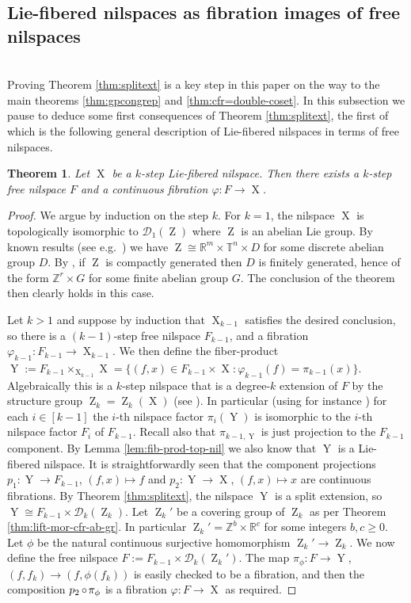 \documentclass[a4paper,12pt,reqno]{amsart}
\newtheorem{theorem}{Theorem}[section]
\theoremstyle{definition}
\def\to{\rightarrow}
\newcommand{\mc}{\mathcal}
\newcommand{\mb}{\mathbb}
\DeclareMathOperator{\ab}{Z}
\DeclareMathOperator{\ns}{X}
\DeclareMathOperator{\nss}{Y}
\DeclareMathOperator{\co}{\circ\hspace{-0.02 cm}}
\begin{document}
\subsection{Lie-fibered nilspaces as fibration images of free nilspaces}\hfill\smallskip\\
Proving Theorem \ref{thm:splitext} is a key step in this paper on the way to the main theorems \ref{thm:gpcongrep} and \ref{thm:cfr=double-coset}. In this subsection we pause to deduce some first consequences of Theorem \ref{thm:splitext}, the first of  which is the following general description of Lie-fibered nilspaces in terms of free nilspaces.
\begin{theorem}\label{thm:lcfr-factor-of-free}
Let $\ns$ be a $k$-step Lie-fibered nilspace. Then there exists a $k$-step free nilspace $F$ and a continuous fibration $\varphi:F\to\ns$.
\end{theorem}
\begin{proof}
We argue by induction on the step $k$. For $k=1$, the nilspace $\ns$ is topologically isomorphic to $\mc{D}_1(\ab)$ where $\ab$ is an abelian Lie group. By known results (see e.g.\ \cite[Theorem 2.4]{Mosk}) we have $\ab\cong \mb{R}^m\times \mb{T}^n\times D$ for some discrete abelian group $D$. By \cite[Corollary 12]{Fu&Shak}, if $\ab$ is compactly generated then $D$ is finitely generated, hence of the form $\mb{Z}^r\times G$ for some finite abelian group $G$. The conclusion of the theorem then clearly holds in this case.

Let $k>1$ and suppose by induction that $\ns_{k-1}$ satisfies the desired conclusion, so there is a $(k-1)$-step free nilspace $F_{k-1}$, and a fibration $\varphi_{k-1}: F_{k-1}\to \ns_{k-1}$. We then define the fiber-product
$\nss:=F_{k-1}\times_{\ns_{k-1}}\ns = \{(f,x)\in F_{k-1}\times \ns: \varphi_{k-1}(f)=\pi_{k-1}(x)\}$. Algebraically this is a $k$-step nilspace that is a degree-$k$ extension of $F$ by the structure group $\ab_k=\ab_k(\ns)$ (see \cite[Proposition A.17]{CGSS-p-hom}). In particular (using for instance \cite[Proposition A.21]{CGSS-p-hom}) for each $i\in [k-1]$ the $i$-th nilspace factor $\pi_i(\nss)$ is isomorphic to the $i$-th nilspace factor $F_i$ of $F_{k-1}$. Recall also that $\pi_{k-1,\nss}$ is just projection to the $F_{k-1}$ component. By Lemma \ref{lem:fib-prod-top-nil} we also know that $\nss$ is a Lie-fibered nilspace. It is straightforwardly seen that the component projections $p_1:\nss\to F_{k-1}$, $(f,x)\mapsto f$ and $p_2:\nss\to \ns$, $(f,x)\mapsto x$ are continuous fibrations. By Theorem \ref{thm:splitext}, the nilspace $\nss$ is a  split extension, so $\nss\cong F_{k-1}\times \mc{D}_k(\ab_k)$. Let $\ab_k'$ be a covering group of $\ab_k$ as per Theorem \ref{thm:lift-mor-cfr-ab-gr}. In particular $\ab_k'= \mb{Z}^b\times\mb{R}^c$ for some integers $b,c\ge 0$.  Let $\phi$ be the natural continuous surjective homomorphism $\ab_k'\to \ab_k$.  We now define the free nilspace $F:= F_{k-1}\times \mc{D}_k(\ab_k')$. The map $\pi_\phi:F\to\nss$, $(f,f_k)\to (f,\phi(f_k))$ is easily checked to be a fibration, and then the composition $p_2\co \pi_{\phi}$ is a fibration $\varphi:F\to \ns$ as required. 
\end{proof}
\end{document}

